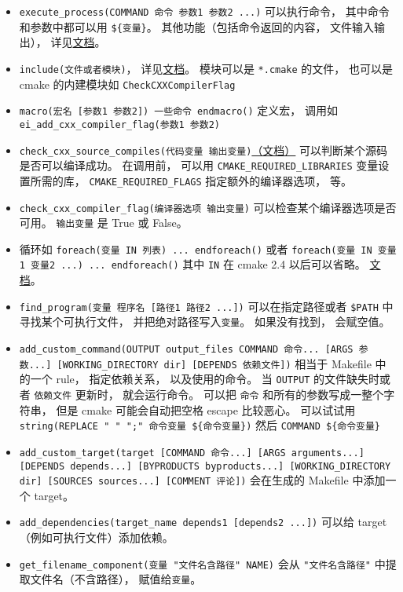 \begin{itemize}
\item \verb|execute_process(COMMAND 命令 参数1 参数2 ...)| 可以执行命令， 其中命令和参数中都可以用 \verb|${变量}|。 其他功能（包括命令返回的内容， 文件输入输出）， 详见\href{https://cmake.org/cmake/help/latest/command/execute_process.html}{文档}。
\item \verb|include(文件或者模块)|， 详见\href{https://cmake.org/cmake/help/latest/command/include.html}{文档}。 模块可以是 \verb|*.cmake| 的文件， 也可以是 cmake 的内建模块如 \verb|CheckCXXCompilerFlag|
\item \verb|macro(宏名 [参数1 参数2]) 一些命令 endmacro()| 定义宏， 调用如 \verb|ei_add_cxx_compiler_flag(参数1 参数2)|
\item \verb|check_cxx_source_compiles(代码变量 输出变量)|\href{https://cmake.org/cmake/help/latest/module/CheckCXXSourceCompiles.html}{（文档）} 可以判断某个源码是否可以编译成功。 在调用前， 可以用 \verb|CMAKE_REQUIRED_LIBRARIES| 变量设置所需的库， \verb|CMAKE_REQUIRED_FLAGS| 指定额外的编译器选项， 等。
\item \verb|check_cxx_compiler_flag(编译器选项 输出变量)| 可以检查某个编译器选项是否可用。 \verb|输出变量| 是 True 或 False。
\item 循环如 \verb|foreach(变量 IN 列表) ... endforeach()| 或者 \verb|foreach(变量 IN 变量1 变量2 ...) ... endforeach()| 其中 \verb|IN| 在 cmake 2.4 以后可以省略。 \href{https://cmake.org/cmake/help/latest/command/foreach.html}{文档}。
\item \verb|find_program(变量 程序名 [路径1 路径2 ...])| 可以在指定路径或者 \verb|$PATH| 中寻找某个可执行文件， 并把绝对路径写入\verb|变量|。 如果没有找到， 会赋空值。
\item \verb|add_custom_command(OUTPUT output_files COMMAND 命令... [ARGS 参数...] [WORKING_DIRECTORY dir] [DEPENDS 依赖文件])| 相当于 Makefile 中的一个 rule， 指定依赖关系， 以及使用的命令。 当 \verb|OUTPUT| 的文件缺失时或者 \verb|依赖文件| 更新时， 就会运行命令。 可以把 \verb|命令| 和所有的参数写成一整个字符串， 但是 cmake 可能会自动把空格 escape 比较恶心。 可以试试用 \verb|string(REPLACE " " ";" 命令变量 ${命令变量})| 然后 \verb|COMMAND ${命令变量}|
\item \verb|add_custom_target(target [COMMAND 命令...] [ARGS arguments...] [DEPENDS depends...] [BYPRODUCTS byproducts...] [WORKING_DIRECTORY dir] [SOURCES sources...] [COMMENT 评论])| 会在生成的 Makefile 中添加一个 target。
\item \verb|add_dependencies(target_name depends1 [depends2 ...])| 可以给 target（例如可执行文件）添加依赖。
\item \verb|get_filename_component(变量 "文件名含路径" NAME)| 会从 \verb|"文件名含路径"| 中提取文件名（不含路径）， 赋值给\verb|变量|。
\end{itemize}

